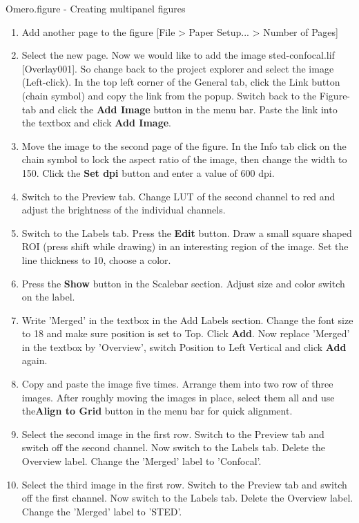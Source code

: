 \begin{taskbox}{Omero.figure - Creating multipanel figures}
  \begin{enumerate}
    \item Add another page to the figure [File > Paper Setup... > Number of
    Pages]
    \item Select the new page. Now we would like to add the image sted-confocal.lif [Overlay001]. So change back to the project
    explorer and select the image (Left-click). In the top left corner
    of the General tab, click the Link button (chain symbol) and copy the link from
    the popup. Switch back to the Figure-tab and click the \textbf{Add Image}
    button in the menu bar. Paste the link into the textbox and click
    \textbf{Add Image}.
    \item Move the image to the second page of the figure. In the Info tab click on the chain symbol to lock the aspect ratio of the image, then change the width to 150. Click the  \textbf{Set dpi} button and enter a value of 600 dpi.
    \item Switch to the Preview tab. Change LUT of the second channel to red and adjust the brightness of the individual channels.
    \item Switch to the Labels tab. Press the \textbf{Edit} button. Draw a small square shaped ROI (press shift while drawing) in an interesting region of the image. Set the line thickness to 10, choose a color.
    \item Press the \textbf{Show} button in the Scalebar section. Adjust size and color switch on the label.
    \item Write 'Merged' in the textbox in the Add Labels section. Change the font size to 18 and make sure position is set to Top. Click \textbf{Add}. Now replace 'Merged' in the textbox by  'Overview', switch Position to Left Vertical and click \textbf{Add} again.
    \item Copy and paste the image five times. Arrange them into two row of three images. After roughly moving the images in place, select them all and use the\textbf{Align to Grid} button in the menu bar for quick alignment.
    \item Select the second image in the first row. Switch to the Preview tab and switch off the second channel. Now switch to the Labels tab. Delete the Overview label. Change the 'Merged' label to 'Confocal'.
    \item Select the third image in the first row. Switch to the Preview tab and switch off the first channel. Now switch to the Labels tab. Delete the Overview label. Change the 'Merged' label to 'STED'.

\end{enumerate}
\end{taskbox}

